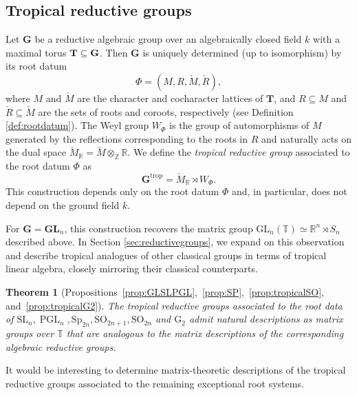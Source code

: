 \documentclass[10pt, a4paper]{amsart}
\newtheorem{maintheorem}{Theorem}[section]
\theoremstyle{definition}
\theoremstyle{myitemstyle}
\newcommand{\R}{\mathbb{R}}
\newcommand{\Z}{\mathbb{Z}}
\newcommand{\RR}{\mathbb{R}}
\newcommand{\T}{\mathbb{T}}
\newcommand{\Mcheck}{{\check{M}}}
\newcommand{\Rcheck}{\check{R}}
\newcommand{\bfG}{\mathbf{G}}
\newcommand{\bfT}{\mathbf{T}}
\DeclareMathOperator{\PGL}{PGL}
\newcommand{\SL}{{\mathrm{SL}}}
\newcommand{\GL}{{\mathrm{GL}}}
\newcommand{\Sp}{{\mathrm{Sp}}}
\newcommand{\SO}{{\mathrm{SO}}}
\newcommand{\trop}{{\mathrm{trop}}}
\begin{document}
\subsection*{Tropical reductive groups}

Let $\bfG$ be a reductive algebraic group over an algebraically closed field $k$ with a maximal torus $\bfT \subseteq \bf G$. Then $\bfG$ is uniquely determined (up to isomorphism) by its root datum 
\begin{equation*}
\Phi = (M,R,\Mcheck,\Rcheck),
\end{equation*}
where $M$ and $\Mcheck$ are the character and cocharacter lattices of $\mathbf{T}$, and $R \subseteq M$ and $\Rcheck \subseteq \Mcheck$ are the sets of roots and coroots, respectively (see Definition \ref{def:rootdatum}). The Weyl group $W_{\Phi}$ is the group of automorphisms of $M$ generated by the reflections corresponding to the roots in $R$ and naturally acts on the dual space $\Mcheck_{\RR} = \Mcheck \otimes_\Z \R$. We define the \emph{tropical reductive group} associated to the root datum $\Phi$ as
\begin{equation*}
    \bfG^{\trop} = \Mcheck_\R\rtimes W_\Phi.
\end{equation*}
This construction depends only on the root datum $\Phi$ and, in particular, does not depend on the ground field $k$.

For $\bfG=\mathbf{GL}_n$, this construction recovers the matrix group $\GL_n(\mathbb{T})\simeq \mathbb{R}^n\rtimes S_n$  described above. In Section \ref{sec:reductivegroups}, we expand on this observation and describe tropical analogues of other classical groups in terms of tropical linear algebra, closely mirroring their classical counterparts.  

\begin{maintheorem}[Propositions~\ref{prop:GLSLPGL},~\ref{prop:SP},~\ref{prop:tropicalSO}, and~\ref{prop:tropicalG2}]
    The tropical reductive groups associated to the root data of $\SL_n, \PGL_n, \Sp_{2n}, \SO_{2n+1}, \SO_{2n}$ and $\mathrm{G}_2$ admit natural descriptions as matrix groups over $\T$ that are analogous to the matrix descriptions of the corresponding algebraic reductive groups. 
\end{maintheorem}

It would be interesting to determine matrix-theoretic descriptions of the tropical reductive groups associated to the remaining exceptional root systems. 
\end{document}
